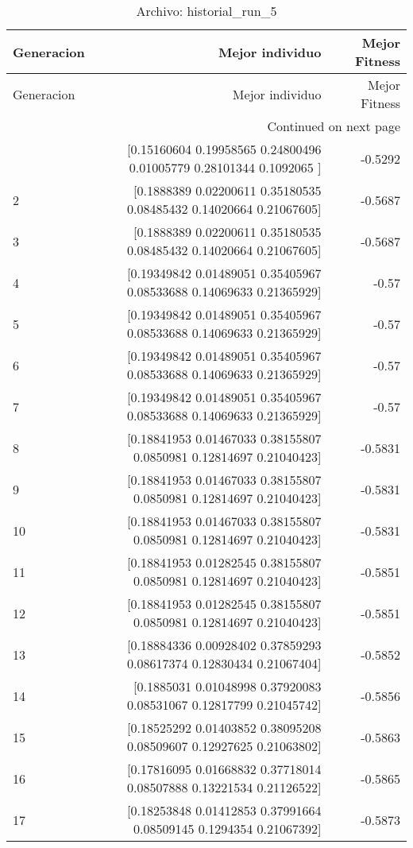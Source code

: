 \begin{longtable}{lrr}
\caption{Archivo: historial\_run\_5}\label{tab:historial_run_5} \\
\toprule
Generacion & Mejor individuo & Mejor Fitness \\
\midrule
\endfirsthead
\toprule
Generacion & Mejor individuo & Mejor Fitness \\
\midrule
\endhead
\midrule
\multicolumn{3}{r}{Continued on next page} \\
\midrule
\endfoot
\bottomrule
\endlastfoot
1 & [0.15160604 0.19958565 0.24800496 0.01005779 0.28101344 0.1092065 ] & -0.5292 \\
2 & [0.1888389  0.02200611 0.35180535 0.08485432 0.14020664 0.21067605] & -0.5687 \\
3 & [0.1888389  0.02200611 0.35180535 0.08485432 0.14020664 0.21067605] & -0.5687 \\
4 & [0.19349842 0.01489051 0.35405967 0.08533688 0.14069633 0.21365929] & -0.57 \\
5 & [0.19349842 0.01489051 0.35405967 0.08533688 0.14069633 0.21365929] & -0.57 \\
6 & [0.19349842 0.01489051 0.35405967 0.08533688 0.14069633 0.21365929] & -0.57 \\
7 & [0.19349842 0.01489051 0.35405967 0.08533688 0.14069633 0.21365929] & -0.57 \\
8 & [0.18841953 0.01467033 0.38155807 0.0850981  0.12814697 0.21040423] & -0.5831 \\
9 & [0.18841953 0.01467033 0.38155807 0.0850981  0.12814697 0.21040423] & -0.5831 \\
10 & [0.18841953 0.01467033 0.38155807 0.0850981  0.12814697 0.21040423] & -0.5831 \\
11 & [0.18841953 0.01282545 0.38155807 0.0850981  0.12814697 0.21040423] & -0.5851 \\
12 & [0.18841953 0.01282545 0.38155807 0.0850981  0.12814697 0.21040423] & -0.5851 \\
13 & [0.18884336 0.00928402 0.37859293 0.08617374 0.12830434 0.21067404] & -0.5852 \\
14 & [0.1885031  0.01048998 0.37920083 0.08531067 0.12817799 0.21045742] & -0.5856 \\
15 & [0.18525292 0.01403852 0.38095208 0.08509607 0.12927625 0.21063802] & -0.5863 \\
16 & [0.17816095 0.01668832 0.37718014 0.08507888 0.13221534 0.21126522] & -0.5865 \\
17 & [0.18253848 0.01412853 0.37991664 0.08509145 0.1294354  0.21067392] & -0.5873 \\

\end{longtable}
